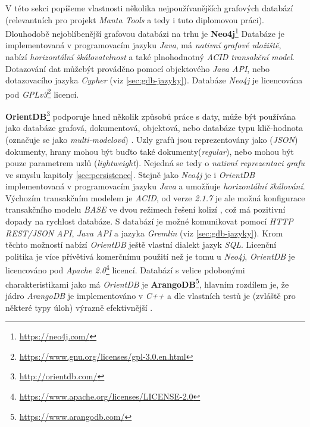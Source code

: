 V této sekci popíšeme vlastnosti několika nejpoužívanějších grafových databází (relevantních pro projekt \textit{Manta Tools} a tedy i tuto diplomovou práci). Dlouhodobě nejoblíbenější grafovou databázi na trhu \cite{Ranking17} je \textbf{Neo4j}\footnote{\url{https://neo4j.com/}} Databáze je implementovaná v programovacím jazyku \textit{Java}, má \textit{nativní grafové uložiště}, nabízí \textit{horizontální škálovatelnost} a také plnohodnotný \textit{ACID transakční model}. Dotazování dat můžebýt prováděno pomocí objektového \textit{Java API}, nebo dotazovacího jazyka \textit{Cypher} (viz \ref{sec:gdb-jazyky}). Databáze \textit{Neo4j} je licencována pod \textit{GPLv3}\footnote{\url{https://www.gnu.org/licenses/gpl-3.0.en.html}} licencí.

\textbf{OrientDB}\footnote{\url{http://orientdb.com/}} podporuje hned několik způsobů práce s daty, může být používána jako databáze grafová, dokumentová, objektová, nebo databáze typu klič-hodnota (označuje se jako \textit{multi-modelová}) \cite{OrientMultiModel}. Uzly grafů jsou reprezentovány jako (\textit{JSON}) dokumenty, hrany mohou být buďto také dokumenty(\textit{regular}), nebo mohou být pouze parametrem uzlů (\textit{lightweight}). Nejedná se tedy o \textit{nativní reprezentaci grafu} ve smyslu kapitoly \ref{sec:persistence}. %
Stejně jako \textit{Neo4j} je i \textit{OrientDB} implementovaná v programovacím jazyku \textit{Java} a umožňuje \textit{horizontální škálování}. Výchozím transakčním modelem je \textit{ACID}, od verze \textit{2.1.7} je ale možná konfigurace transakčního modelu \textit{BASE} ve dvou režimech řešení kolizí \cite{OrientConsistency}, což má pozitivní dopady na rychlost databáze. S databází je možné komunikovat pomocí \textit{HTTP REST/JSON API}, \textit{Java API} a jazyka \textit{Gremlin} (viz \ref{sec:gdb-jazyky}). Krom těchto možností nabízí \textit{OrientDB} ještě vlastní dialekt jazyk \textit{SQL}. Licenční politika je více přívětivá komerčnímu použití než je tomu u \textit{Neo4j}, \textit{OrientDB} je licencováno pod \textit{Apache 2.0}\footnote{\url{https://www.apache.org/licenses/LICENSE-2.0}} licencí. Databází s velice pdobonými charakteristikami jako má \textit{OrientDB} je \textbf{ArangoDB}\footnote{\url{https://www.arangodb.com/}}, hlavním rozdílem je, že jádro \textit{ArangoDB} je implementováno v \textit{C++} a dle vlastních testů je (zvláště pro některé typy úloh) výrazně efektivnější \cite{ArangoBenchmark}. 
 
